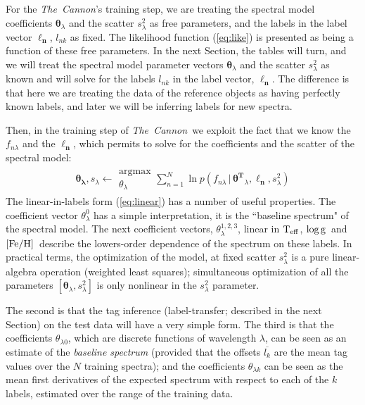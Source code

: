 \documentclass[12pt, preprint]{aastex}
\newcommand{\set}[1]{\bm{#1}}
\newcommand{\mean}[1]{\overline{#1}}
\newcommand{\given}{\,|\,}
\newcommand{\teff}{\mbox{$\rm T_{eff}$}}
\newcommand{\feh}{\mbox{$\rm [Fe/H]$}}
\newcommand{\logg}{\mbox{$\rm \log g$}}
\newcommand{\tc}{\textsl{The~Cannon}}
\begin{document}
For the \tc 's training step, we are treating the spectral model coefficients
$\set{\theta}_\lambda$ and the scatter $s_\lambda^2$ as free parameters, and the
labels in the label vector $\set{\ell_n}$, $l_{nk}$ as fixed.
The likelihood function (\ref{eq:like}) is presented as being a
function of these free parameters.
In the next Section, the tables will turn, and we will treat the
spectral model parameter vectors $\set{\theta}_\lambda$ and the scatter $s_{\lambda}^2$ as known and will solve for the
labels $l_{nk}$ in the label vector, $\set{\ell_n}$.
The difference is that here we are treating the data of the reference objects as
having perfectly known labels, and later we will be inferring labels for
new spectra.

Then, in the training step of \tc\ we exploit the fact that we know the $f_{n\lambda}$
and the $\set{\ell_n}$, which permits to solve for the coefficients and the scatter of the spectral model:
\begin{eqnarray}
\set{\theta_\lambda},s_\lambda \leftarrow \substack{\mbox{argmax}\\
{\theta_\lambda}  }
\sum_{n=1}^N \ln p(f_{n\lambda}\given\set{\theta^T}_\lambda, \boldsymbol{\ell_n}, s_\lambda^2)
\label{eq:trainingstep}
\end{eqnarray}
The linear-in-labels form (\ref{eq:linear}) has a number of useful properties.
The coefficient vector $\theta^0_\lambda$ has a simple interpretation, it is the ``baseline spectrum" of the spectral model. 
The next coefficient vectors,  $\theta^{1,2,3}_\lambda$, linear in \teff , \logg ~and \feh\ 
describe the lowers-order dependence of the spectrum on these labels.
In practical terms, the optimization of the model, at fixed scatter
$s_\lambda^2$ is a pure linear-algebra operation (weighted least
squares); simultaneous optimization of all the parameters
$[\set{\theta}_\lambda,s_\lambda^2]$ is only nonlinear in the $s_\lambda^2$
parameter.

%
The second is that the tag inference (label-transfer; described in the
next Section) on the test data will have a very simple form.
The third is that the coefficients $\theta_{\lambda 0}$, which are discrete
functions of wavelength $\lambda$, can be seen as an estimate of
the \emph{baseline spectrum} (provided that the offsets $\mean{l_k}$ are
the mean tag values over the $N$ training spectra); and the
coefficients $\theta_{\lambda k}$ can be seen as the mean first derivatives of
the expected spectrum with respect to each of the $k$ labels, estimated
over the range of the training data.
\end{document}
